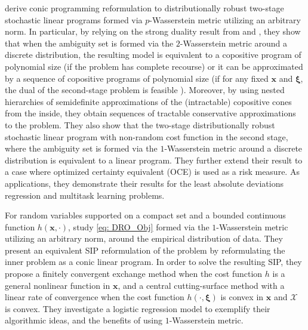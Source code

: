 \documentclass[final,onefignum,onetabnum]{class}
\newcommand{\bs}[1]{\boldsymbol{#1}} %
\newcommand{\Cs}[1]{\mathcal{#1}} %
\begin{document}
\citet{hanasusanto2018} derive conic programming reformulation to distributionally robust  two-stage  stochastic linear programs formed via $p$-Wasserstein metric utilizing an arbitrary norm. In particular, by relying on the strong duality result from \citet{mohajerin2018} and \citet{gao2016}, they show that when the ambiguity set is formed via the  $2$-Wasserstein metric around a discrete distribution, the resulting model is equivalent to a copositive program of polynomial size  (if the problem
has complete recourse) or it can be approximated  by a sequence of
copositive programs of polynomial size  (if for any fixed $\bs{x}$ and $\bs{\xi}$, the dual of the second-stage problem is feasible%
). Moreover,  by using nested hierarchies of  semidefinite approximations of the %
(intractable) copositive cones
from the inside, they obtain sequences
of tractable conservative approximations to the problem. They also show that the two-stage distributionally robust stochastic linear program with non-random cost function in the second stage, where the ambiguity set is formed via the $1$-Wasserstein metric around a discrete distribution %
is equivalent
to a  linear program. They further extend their result to a case where optimized certainty equivalent (OCE) \citep{bental1986,bental2007OCE} is used as a risk measure. As applications, they demonstrate their results for the least absolute deviations  regression and multitask learning problems. 

For random variables  supported on a compact set and a bounded continuous function $h(\bs{x}, \cdot)$,  \citet{luo2019} study \eqref{eq: DRO_Obj} formed via the  $1$-Wasserstein metric utilizing an arbitrary norm, around the empirical distribution of data. They present an equivalent SIP reformulation of the problem by reformulating the inner problem as a conic linear program. In order to solve the resulting SIP, they propose a finitely convergent  exchange method when  the cost  function $h$ is a general nonlinear function in $\bs{x}$, and a central cutting-surface method with a linear rate of convergence when the cost function $h(\cdot, \bs{\xi})$ is convex in $\bs{x}$ and $\Cs{X}$ is convex. They investigate a logistic regression model to exemplify their algorithmic ideas, and the benefits of using $1$-Wasserstein metric.  
\end{document}

